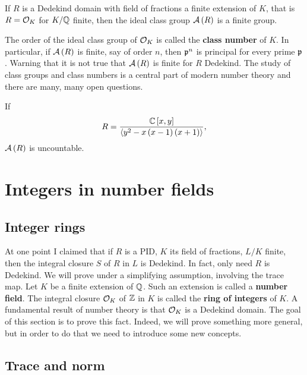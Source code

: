 \begin{theorem}
If $ R $ is a Dedekind domain with field of fractions a finite extension of $ K $, that is $ R = \mathcal{O}_K $ for $ K / \mathbb{Q} $ finite, then the ideal class group $ \mathcal{A}\left( R \right) $ is a finite group.
\end{theorem}

The order of the ideal class group of $ \mathcal{O}_K $ is called the \textbf{class number} of $ K $. In particular, if $ \mathcal{A}\left( R \right) $ is finite, say of order $ n $, then $ \mathfrak{p}^n $ is principal for every prime $ \mathfrak{p} $. Warning that it is not true that $ \mathcal{A}\left( R \right) $ is finite for $ R $ Dedekind. The study of class groups and class numbers is a central part of modern number theory and there are many, many open questions.

\begin{example*}
If
$$ R = \dfrac{\mathbb{C}\left[ x, y \right]}{\left\langle y^2 - x\left( x - 1 \right)\left( x + 1 \right) \right\rangle}, $$
$ \mathcal{A}\left( R \right) $ is uncountable.
\end{example*}

\pagebreak

\section{Integers in number fields}

\subsection{Integer rings}

At one point I claimed that if $ R $ is a PID, $ K $ its field of fractions, $ L / K $ finite, then the integral closure $ S $ of $ R $ in $ L $ is Dedekind. In fact, only need $ R $ is Dedekind. We will prove under a simplifying assumption, involving the trace map. Let $ K $ be a finite extension of $ \mathbb{Q} $. Such an extension is called a \textbf{number field}. The integral closure $ \mathcal{O}_K $ of $ \mathbb{Z} $ in $ K $ is called the \textbf{ring of integers} of $ K $. A fundamental result of number theory is that $ \mathcal{O}_K $ is a Dedekind domain. The goal of this section is to prove this fact. Indeed, we will prove something more general, but in order to do that we need to introduce some new concepts.

\subsection{Trace and norm}

